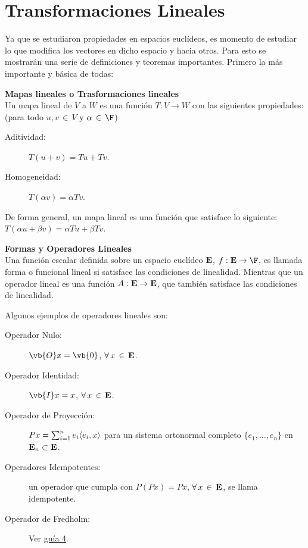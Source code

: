 \section*{Transformaciones Lineales}
Ya que se estudiaron propiedades en espacios euclídeos, es momento de estudiar lo que modifica los vectores en dicho espacio y hacia otros. Para esto se mostrarán una serie de definiciones y teoremas importantes. Primero la más importante y básica de todas:

\begin{mdframed}[style=warning]
	{\large \textbf{Mapas lineales o Trasformaciones lineales}} \\
	Un mapa lineal de $V$ a $W$ es una función $T:V\to W$ con las siguientes propiedades: (para todo $u,v\, \in \, V$ y $\alpha \, \in \, \F$)
	\begin{description}
		\item[Aditividad: ] $T(u + v) = Tu + Tv$.
		\item[Homogeneidad: ] $T(\alpha v) = \alpha Tv$.
	\end{description}
	De forma general, un mapa lineal es una función que satisface lo siguiente: $T(\alpha u + \beta v) = \alpha Tu + \beta Tv$.
\end{mdframed}





\begin{mdframed}[style=warning]
	{\large \textbf{Formas y Operadores Lineales}} \\
	Una función escalar definida sobre un espacio euclídeo $\mathbf{E}$, $f:\E \to \F$, es llamada forma o funcional lineal si satisface las condiciones de linealidad. Mientras que un operador lineal es una función $A:\mathbf{E} \to \mathbf{E}$, que también satisface las condiciones de linealidad.
\end{mdframed}


Algunos ejemplos de operadores lineales son:


\begin{description}
	\item[Operador Nulo: ] $\vb{O} x = \vb{0}$, $\forall \, x \, \in \, \mathbf{E}$.
	\item[Operador Identidad: ] $\vb{I} x = x$, $\forall \, x \, \in \, \mathbf{E}$.
	\item[Operador de Proyección: ] $Px = \sum _{i = 1} ^n e_i \langle e_i , x \rangle$ para un sistema ortonormal completo $\{ e_1, \ldots ,e_n \}$ en $\mathbf{E} _n \subset \mathbf{E}$.
	\item[Operadores Idempotentes: ] un operador que cumpla con $P(Px) = Px$, $\forall \, x \, \in \, \mathbf{E}$, se llama idempotente.
	\item[Operador de Fredholm: ] Ver \href{https://github.com/DSarceno/Auxiliatura/blob/main/Metodos\%20Matematicos/guia4/guia4.pdf}{guía 4}.
\end{description}


